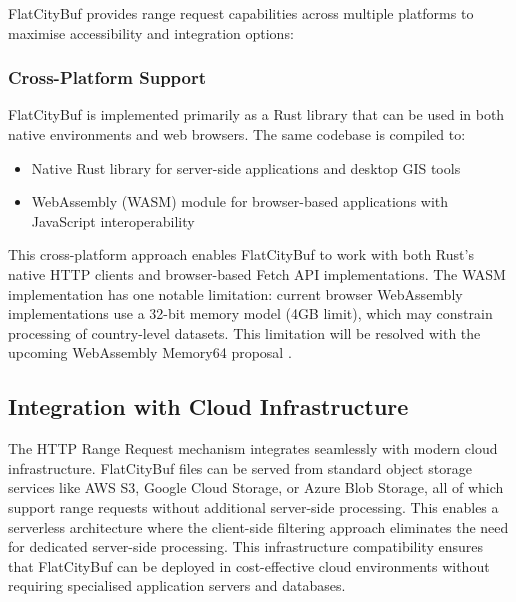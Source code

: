 FlatCityBuf provides range request capabilities across multiple platforms to maximise accessibility and integration options:
\subsubsection{Cross-Platform Support}
\label{methodology:http_range_requests:cross_platform_implementation:cross_platform}

FlatCityBuf is implemented primarily as a Rust library that can be used in both native environments and web browsers. The same codebase is compiled to:

\begin{itemize}
  \item Native Rust library for server-side applications and desktop GIS tools
  \item WebAssembly (WASM) module for browser-based applications with JavaScript interoperability
\end{itemize}

This cross-platform approach enables FlatCityBuf to work with both Rust's native HTTP clients and browser-based Fetch API implementations. The WASM implementation has one notable limitation: current browser WebAssembly implementations use a 32-bit memory model (4GB limit), which may constrain processing of country-level datasets. This limitation will be resolved with the upcoming WebAssembly Memory64 proposal \citep{WebAssemblyCoreSpecification2}.

\subsection{Integration with Cloud Infrastructure}
\label{methodology:http_range_requests:cloud_integration}

The HTTP Range Request mechanism integrates seamlessly with modern cloud infrastructure. FlatCityBuf files can be served from standard object storage services like AWS S3, Google Cloud Storage, or Azure Blob Storage, all of which support range requests without additional server-side processing. This enables a serverless architecture where the client-side filtering approach eliminates the need for dedicated server-side processing. This infrastructure compatibility ensures that FlatCityBuf can be deployed in cost-effective cloud environments without requiring specialised application servers and databases.

